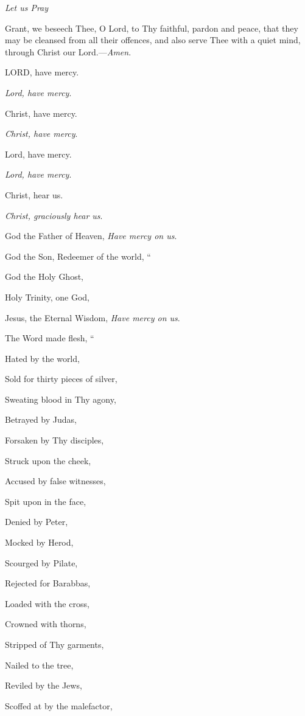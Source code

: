 \emph{Let
us Pray}

Grant, we beseech Thee, O Lord,
to Thy faithful, pardon and peace, that they may be cleansed from all
their offences, and also serve Thee with a quiet mind, through Christ
our Lord.—\emph{Amen}.



LORD, have mercy.

\emph{Lord, have mercy}.

Christ, have mercy.

\emph{Christ, have mercy}.

Lord, have mercy.

\emph{Lord, have mercy}.

Christ, hear us.

\emph{Christ, graciously hear us}.

God the Father of Heaven,
\emph{Have mercy on us}.

God the Son, Redeemer of the world,
``

God the Holy Ghost,

Holy Trinity, one God,

Jesus, the Eternal Wisdom,
\emph{Have mercy on us}.

The Word made flesh,
``

Hated by the world,

Sold for thirty pieces of silver,

Sweating blood in Thy agony,

Betrayed by Judas,

Forsaken by Thy disciples,

Struck upon the cheek, 

Accused by false witnesses,

Spit upon in the face,

Denied by Peter,

Mocked by Herod,

Scourged by Pilate,

Rejected for Barabbas,

Loaded with the cross,

Crowned with thorns,

Stripped of Thy garments,

Nailed to the tree,

Reviled by the Jews,

Scoffed at by the malefactor,

